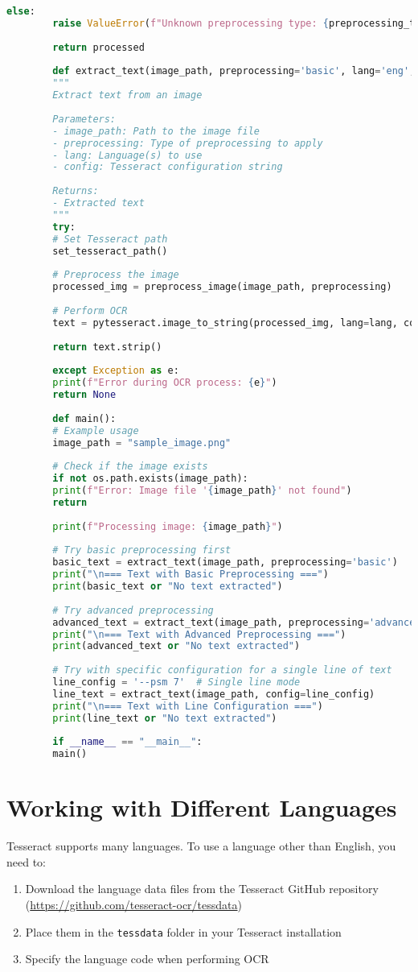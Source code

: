 \documentclass{book}
\begin{document}
\begin{lstlisting}[language=Python]
		else:
		raise ValueError(f"Unknown preprocessing type: {preprocessing_type}")
		
		return processed
		
		def extract_text(image_path, preprocessing='basic', lang='eng', config=''):
		"""
		Extract text from an image
		
		Parameters:
		- image_path: Path to the image file
		- preprocessing: Type of preprocessing to apply
		- lang: Language(s) to use
		- config: Tesseract configuration string
		
		Returns:
		- Extracted text
		"""
		try:
		# Set Tesseract path
		set_tesseract_path()
		
		# Preprocess the image
		processed_img = preprocess_image(image_path, preprocessing)
		
		# Perform OCR
		text = pytesseract.image_to_string(processed_img, lang=lang, config=config)
		
		return text.strip()
		
		except Exception as e:
		print(f"Error during OCR process: {e}")
		return None
		
		def main():
		# Example usage
		image_path = "sample_image.png"
		
		# Check if the image exists
		if not os.path.exists(image_path):
		print(f"Error: Image file '{image_path}' not found")
		return
		
		print(f"Processing image: {image_path}")
		
		# Try basic preprocessing first
		basic_text = extract_text(image_path, preprocessing='basic')
		print("\n=== Text with Basic Preprocessing ===")
		print(basic_text or "No text extracted")
		
		# Try advanced preprocessing
		advanced_text = extract_text(image_path, preprocessing='advanced')
		print("\n=== Text with Advanced Preprocessing ===")
		print(advanced_text or "No text extracted")
		
		# Try with specific configuration for a single line of text
		line_config = '--psm 7'  # Single line mode
		line_text = extract_text(image_path, config=line_config)
		print("\n=== Text with Line Configuration ===")
		print(line_text or "No text extracted")
		
		if __name__ == "__main__":
		main()
	\end{lstlisting}
	
	\section{Working with Different Languages}
	Tesseract supports many languages. To use a language other than English, you need to:
	\begin{enumerate}
		\item Download the language data files from the Tesseract GitHub repository (\url{https://github.com/tesseract-ocr/tessdata})
		\item Place them in the \texttt{tessdata} folder in your Tesseract installation 
		\item Specify the language code when performing OCR
	\end{enumerate}
	
\end{document}
